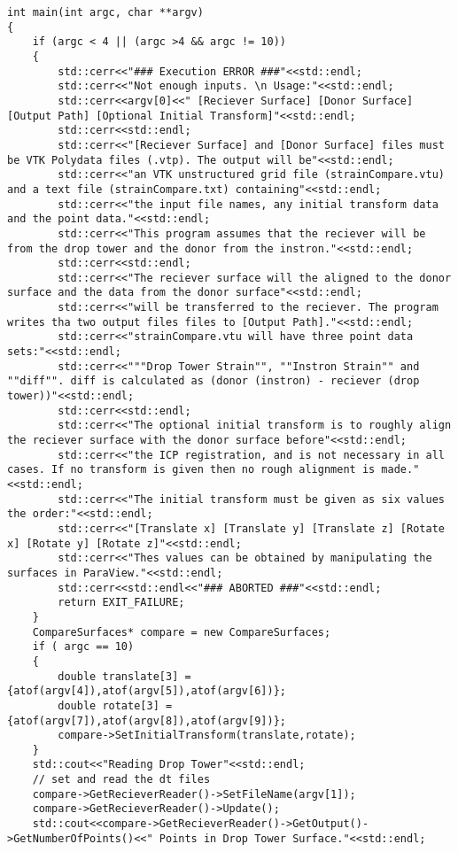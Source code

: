 \begin{lstlisting}
int main(int argc, char **argv)
{
    if (argc < 4 || (argc >4 && argc != 10))
    {
        std::cerr<<"### Execution ERROR ###"<<std::endl;
        std::cerr<<"Not enough inputs. \n Usage:"<<std::endl;
        std::cerr<<argv[0]<<" [Reciever Surface] [Donor Surface] [Output Path] [Optional Initial Transform]"<<std::endl;
        std::cerr<<std::endl;
        std::cerr<<"[Reciever Surface] and [Donor Surface] files must be VTK Polydata files (.vtp). The output will be"<<std::endl;
        std::cerr<<"an VTK unstructured grid file (strainCompare.vtu) and a text file (strainCompare.txt) containing"<<std::endl;
        std::cerr<<"the input file names, any initial transform data and the point data."<<std::endl;
        std::cerr<<"This program assumes that the reciever will be from the drop tower and the donor from the instron."<<std::endl;
        std::cerr<<std::endl;
        std::cerr<<"The reciever surface will the aligned to the donor surface and the data from the donor surface"<<std::endl;
        std::cerr<<"will be transferred to the reciever. The program writes tha two output files files to [Output Path]."<<std::endl;
        std::cerr<<"strainCompare.vtu will have three point data sets:"<<std::endl;
        std::cerr<<"""Drop Tower Strain"", ""Instron Strain"" and ""diff"". diff is calculated as (donor (instron) - reciever (drop tower))"<<std::endl;
        std::cerr<<std::endl;
        std::cerr<<"The optional initial transform is to roughly align the reciever surface with the donor surface before"<<std::endl;
        std::cerr<<"the ICP registration, and is not necessary in all cases. If no transform is given then no rough alignment is made."<<std::endl;
        std::cerr<<"The initial transform must be given as six values the order:"<<std::endl;
        std::cerr<<"[Translate x] [Translate y] [Translate z] [Rotate x] [Rotate y] [Rotate z]"<<std::endl;
        std::cerr<<"Thes values can be obtained by manipulating the surfaces in ParaView."<<std::endl;
        std::cerr<<std::endl<<"### ABORTED ###"<<std::endl;
        return EXIT_FAILURE;
    }
    CompareSurfaces* compare = new CompareSurfaces;
    if ( argc == 10)
    {
        double translate[3] = {atof(argv[4]),atof(argv[5]),atof(argv[6])};
        double rotate[3] = {atof(argv[7]),atof(argv[8]),atof(argv[9])};
        compare->SetInitialTransform(translate,rotate);
    }
	std::cout<<"Reading Drop Tower"<<std::endl;
	// set and read the dt files
	compare->GetRecieverReader()->SetFileName(argv[1]);
	compare->GetRecieverReader()->Update();
	std::cout<<compare->GetRecieverReader()->GetOutput()->GetNumberOfPoints()<<" Points in Drop Tower Surface."<<std::endl;


\end{lstlisting}
